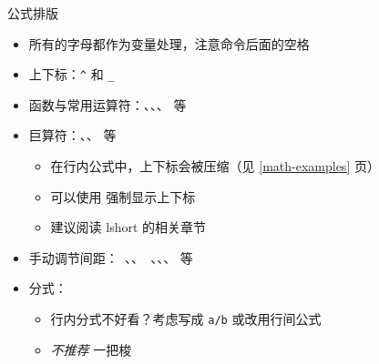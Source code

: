 \begin{frame}[fragile]{公式排版}
  \begin{itemize}
      \item 所有的字母都作为变量处理，注意命令后面的空格
      \item 上下标：\texttt{^} 和 \texttt{_}
      \item 函数与常用运算符：\texttt{\sin}、\texttt{\log}、\texttt{\lim}、\texttt{\max} 等
      \item 巨算符：\texttt{\sum}、\texttt{\prod}、\texttt{\int} 等
      \begin{itemize}
          \item 在行内公式中，上下标会被压缩（见 \ref{math-examples} 页）
          \item 可以使用 \texttt{\limits} 强制显示上下标
          \item 建议阅读 lshort 的相关章节
      \end{itemize}
      \item 手动调节间距：\texttt{\,}、\texttt{\:}、\texttt{\ }、\texttt{\!}、\texttt{\quad}、\texttt{\qquad} 等
      \item 分式：\texttt{}
      \begin{itemize}
          \item 行内分式不好看？考虑写成 \texttt{a/b} 或改用行间公式
          \item \emph{不推荐} \texttt{\dfrac} 一把梭
      \end{itemize}
  \end{itemize}
  \end{frame}
  
